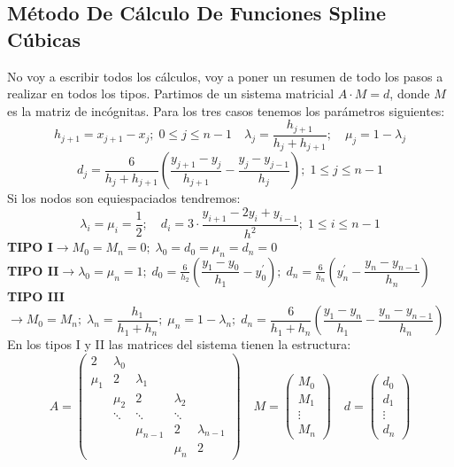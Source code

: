 \documentclass[12pt,a4paper,oneside]{scrbook}
\begin{document}
\subsection*{Método De Cálculo De Funciones Spline Cúbicas}
No voy a escribir todos los cálculos, voy a poner un resumen de todo los pasos a realizar en todos los tipos. Partimos de un sistema matricial $A\cdot M=d$, donde $M$ es la matriz de incógnitas. Para los tres casos tenemos los parámetros siguientes:
\[
h_{j+1}=x_{j+1}-x_j;\;0\leq j\leq n-1\quad \lambda_j=\dfrac{h_{j+1}}{h_j+h_{j+1}};\quad\mu_j=1-\lambda_j
\]
\[
d_j=\dfrac{6}{h_j+h_{j+1}}\left( \dfrac{y_{j+1}-y_j}{h_{j+1}}-\dfrac{y_j-y_{j-1}}{h_j} \right);\;1\leq j\leq n-1
\]
Si los nodos son equiespaciados tendremos:
\[
\lambda_i=\mu_i=\frac{1}{2};\quad d_i=3\cdot\dfrac{y_{i+1}-2y_i+y_{i-1}}{h^2};\;1\leq i\leq n-1
\]
\textbf{TIPO I}$\longrightarrow M_0=M_n=0;\; \lambda_0=d_0=\mu_n=d_n=0$\\
\textbf{TIPO II}$\longrightarrow \lambda_0=\mu_n=1;\;d_0=\frac{6}{h_2}\left( \dfrac{y_1-y_0}{h_1}-y_0^\prime \right);\;d_n=\frac{6}{h_n}\left( y_n^\prime - \dfrac{y_n-y_{n-1}}{h_n} \right)$\\
\textbf{TIPO III}$\longrightarrow M_0=M_n;\;\lambda_n=\dfrac{h_1}{h_1+h_n};\;\mu_n = 1-\lambda_n;\;d_n=\dfrac{6}{h_1+h_n}\left( \dfrac{y_1-y_n}{h_1}-\dfrac{y_n-y_{n-1}}{h_n} \right)$\\
En los tipos I y II las matrices del sistema tienen la estructura:
\[
A=
\begin{pmatrix}
    2 & \lambda_0 &        &         &\\
\mu_1 & 2      & \lambda_1 &         &\\
      & \mu_2  & 2         & \lambda_2  &\\
      & \ddots & \ddots    & \ddots & \\
      &        & \mu_{n-1} & 2      & \lambda_{n-1}\\
      &        &           & \mu_n  & 2
\end{pmatrix}\quad
M=
\begin{pmatrix}
    M_0\\
    M_1\\
    \vdots\\
    M_n
\end{pmatrix}\quad
d=
\begin{pmatrix}
    d_0\\
    d_1\\
    \vdots\\
    d_n
\end{pmatrix}
\]
\end{document}

